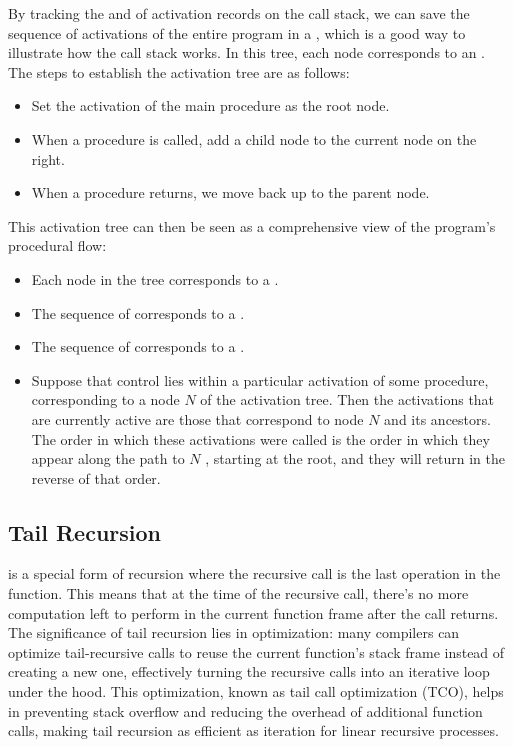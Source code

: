 By tracking the {\color{blue}{pushes (procedure calls)}} and {\color{blue}{pops (procedure returns)}} of activation records on the call stack, we can save the sequence of activations of the entire program in a {\color{blue}{activation tree}}, which is a good way to illustrate how the call stack works. In this tree, each node corresponds to an {\color{blue}{activation record}}. The steps to establish the activation tree are as follows:
\begin{itemize}
	\item Set the activation of the main procedure as the root node.
	\item When a procedure is called, add a child node to the current node on the right.
	\item When a procedure returns, we move back up to the parent node.
\end{itemize}

This activation tree can then be seen as a comprehensive view of the program's procedural flow:
\begin{itemize}
	\item Each node in the tree corresponds to a {\color{blue}{activation record}}.
	\item The sequence of {\color{blue}{procedure calls}} corresponds to a {\color{blue}{preorder traversal of the activation tree}}.
	\item The sequence of {\color{blue}{procedure returns}} corresponds to a {\color{blue}{postorder traversal of the activation tree}}.
	\item Suppose that control lies within a particular activation of some procedure, corresponding to a node $N$ of the activation tree. Then the activations that are currently active are those that correspond to node $N$ and its ancestors. The order in which these activations were called is the order in which they appear along the path to $N$ , starting at the root, and they will return in the reverse of that order.
\end{itemize}

\subsection{Tail Recursion}
{\color{blue}{Tail recursion}} is a special form of recursion where the recursive call is the last operation in the function. This means that at the time of the recursive call, there's no more computation left to perform in the current function frame after the call returns. The significance of tail recursion lies in optimization: many compilers can optimize tail-recursive calls to reuse the current function's stack frame instead of creating a new one, effectively turning the recursive calls into an iterative loop under the hood. This optimization, known as tail call optimization (TCO), helps in preventing stack overflow and reducing the overhead of additional function calls, making tail recursion as efficient as iteration for linear recursive processes.

